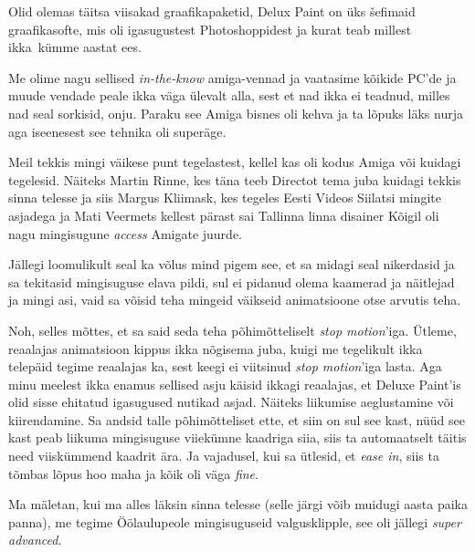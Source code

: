 Olid olemas täitsa viisakad graafikapaketid, Delux Paint on üks šefimaid graafikasofte, mis oli igasugustest Photoshoppidest ja kurat teab millest ikka kümme aastat ees. 

Me olime nagu sellised \emph{in-the-know} amiga-vennad ja vaatasime  kõikide PC'de  ja muude vendade peale ikka väga ülevalt alla, sest et nad ikka ei teadnud, milles nad seal sorkisid, onju. Paraku see Amiga bisnes oli kehva ja ta lõpuks läks nurja aga iseenesest see tehnika oli superäge. 

Meil tekkis mingi väikese   punt tegelastest, kellel kas oli kodus Amiga või kuidagi tegelesid. Näiteks Martin Rinne, kes täna teeb Directot tema juba kuidagi tekkis   sinna telesse ja siis Margus Kliimask, kes tegeles Eesti Videos Siilatsi mingite asjadega ja Mati Veermets kellest pärast sai Tallinna linna  disainer  Kõigil oli nagu mingisugune \emph{access} Amigate juurde. 

Jällegi loomulikult seal ka võlus mind pigem see, et sa midagi seal nikerdasid ja sa tekitasid mingisuguse elava pildi, sul ei  pidanud olema kaamerad ja näitlejad ja mingi asi, vaid sa võisid teha mingeid väikseid  animatsioone otse arvutis teha.


Noh, selles mõttes, et sa said seda teha põhimõtteliselt \emph{stop motion}'iga. Ütleme,  reaalajas animatsioon kippus ikka nõgisema juba, kuigi me tegelikult ikka telepäid tegime reaalajas ka, sest keegi ei viitsinud \emph{stop motion}'iga lasta. Aga minu meelest ikka enamus sellised asju käisid ikkagi reaalajas, et Deluxe Paint'is olid sisse ehitatud igasugused nutikad asjad. Näiteks  liikumise aeglustamine või kiirendamine. Sa andsid talle põhimõtteliset ette, et siin on sul see kast, nüüd see kast peab liikuma mingisuguse viiekümne kaadriga siia, siis ta automaatselt täitis need viiskümmend kaadrit ära. Ja vajadusel, kui sa ütlesid, et \emph{ease in}, siis ta tõmbas lõpus hoo maha ja kõik oli väga \emph{fine}.  

Ma mäletan, kui ma alles läksin sinna telesse (selle järgi võib muidugi aasta paika panna), me tegime Öölaulupeole  mingisuguseid valgusklipple, see oli jällegi \emph{super advanced}.

